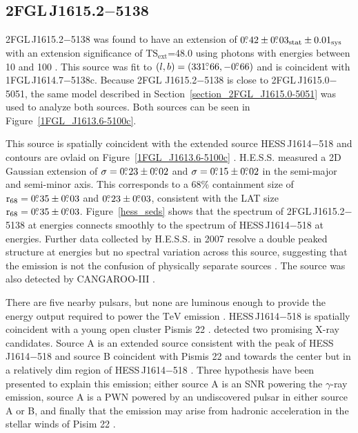 \documentclass[12pt,preprint]{aastex}
\newcommand{\gev}{\text{GeV}\xspace}
\newcommand{\tev}{\text{TeV}\xspace}
\newcommand{\tsext}{{\ensuremath{\text{TS}_{\text{ext}}}}\xspace}
\newcommand{\suzaku}{\text{{\em Suzaku}}\xspace}
\newcommand{\rsixeight}{{\ensuremath{\text{r}_{68}}}\xspace}
\newcommand{\sys}{\text{sys}\xspace}
\newcommand{\stat}{\text{stat}\xspace}
\begin{document}
\subsection{2FGL\,J1615.2$-$5138}
\label{section_2FGL_J1615.2-5138}

2FGL\,J1615.2$-$5138 was found 
 to have an extension of $0\fdg42\pm0\fdg03_\stat\pm0.01_\sys$
with an extension significance of \tsext=48.0
using 
photons with energies between
10 \gev and 100 \gev.  This source was fit to 
$(l,b)=(331\mbox{$.\!\!^\circ$}66,-0\mbox{$.\!\!^\circ$}66)$ and is coincident with
1FGL\,J1614.7$-$5138c.  Because 2FGL
J1615.2$-$5138 is close to 2FGL\,J1615.0$-$5051, the same model described
in Section~\ref{section_2FGL_J1615.0-5051} was used to analyze both
sources. Both sources can be seen in Figure~\ref{1FGL_J1613.6-5100c}.

This source is spatially coincident with the extended
\tev source HESS\,J1614$-$518 and \tev contours
are ovlaid on
Figure~\ref{1FGL_J1613.6-5100c}
\citep{hess_plane_survey}. 
H.E.S.S. measured a 2D Gaussian
extension of $\sigma=0\mbox{$.\!\!^\circ$}23\pm0\mbox{$.\!\!^\circ$}02$ and $\sigma=0\mbox{$.\!\!^\circ$}15\pm0\mbox{$.\!\!^\circ$}02$
in the semi-major and semi-minor axis. This corresponds
to a 68\% containment size of $\rsixeight=0\fdg35\pm0\fdg03$
and $0\mbox{$.\!\!^\circ$}23\pm0\mbox{$.\!\!^\circ$}03$,  consistent with the LAT size
$\rsixeight=0\fdg35\pm0\fdg03$.  Figure~\ref{hess_seds} shows
that the spectrum of 2FGL\,J1615.2$-$5138 at \gev energies
connects smoothly to
the spectrum of HESS\,J1614$-$518 at \tev energies.  Further data collected by
H.E.S.S. in 2007 resolve a double peaked structure at \tev
energies
but no spectral variation across this source, suggesting
that the emission is not the confusion of physically separate sources
\citep{closer_look_hess_j1614-518}.  The source was also detected by
CANGAROO-III \citep{cangaroo_j1614-518}.

There are five nearby pulsars, but none are luminous enough to
provide the energy output required to power the $\tev$ 
emission \citep{closer_look_hess_j1614-518}.  HESS\,J1614$-$518
is spatially coincident with a young open cluster Pismis 22
\citep{hess_1614_landi_atel,closer_look_hess_j1614-518}.
\suzaku detected two
promising X-ray candidates. Source A is an extended source consistent
with the peak of HESS\,J1614$-$518 and source B coincident with Pismis 22
and towards the center but in a relatively dim region of HESS\,J1614$-$518
\citep{suazku_hess_j1614_518}.  Three hypothesis have been presented to
explain this emission; either source A is an SNR powering the $\gamma$-ray
emission, source A is a PWN powered by an undiscovered pulsar in either
source A or B, and finally that the emission may arise from hadronic 
acceleration in the stellar winds of Pisim 22 \citep{cangaroo_j1614-518}.
\end{document}
